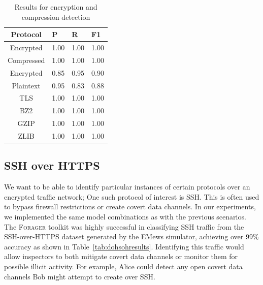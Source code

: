 \begin{table}
\centering
\begin{tabular}{| c | p{0.6cm}  p{0.6cm}  p{0.6cm} |}
 \hline
 \textbf{Protocol} & \textbf{P} & \textbf{R} & \textbf{F1}\\
 \hline
 Encrypted & 1.00 & 1.00 & 1.00\\
 Compressed & 1.00 & 1.00 & 1.00\\
 \hline
 Encrypted & 0.85 & 0.95 & 0.90\\
 Plaintext & 0.95 & 0.83 & 0.88\\
 \hline
 TLS & 1.00 & 1.00 & 1.00\\
 BZ2 & 1.00 & 1.00 & 1.00\\
 GZIP & 1.00 & 1.00 & 1.00\\
 ZLIB & 1.00 & 1.00 & 1.00\\
 \hline
\end{tabular}
\caption{Results for encryption and compression detection}
\end{table}

\subsection{SSH over HTTPS}
We want to be able to identify particular instances of certain protocols over an encrypted traffic network; One such protocol of interest is SSH. This is often used to bypass firewall restrictions or create covert data channels. In our experiments, we implemented the same model combinations as with the previous scenarios. The \textsc{Forager} toolkit was highly successful in classifying SSH traffic from the SSH-over-HTTPS dataset generated by the EMews simulator, achieving over 99\% accuracy as shown in Table~\ref{tab:dohsohresults}. Identifying this traffic would allow inspectors to both mitigate covert data channels or monitor them for possible illicit activity. For example, Alice could detect any open covert data channels Bob might attempt to create over SSH.

